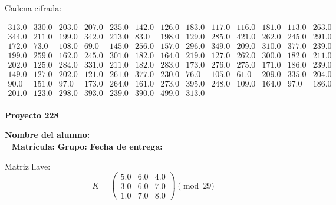 \documentclass[12pt]{article}
\begin{document}
Cadena cifrada:
\begin{center}
$\begin{array}{lllllllllllll}
313.0 & 330.0 & 203.0 & 207.0 & 235.0 & 142.0 & 126.0 & 183.0 & 117.0 & 116.0 & 181.0 & 113.0 & 263.0\\
344.0 & 211.0 & 199.0 & 342.0 & 213.0 & 83.0 & 198.0 & 129.0 & 285.0 & 421.0 & 262.0 & 245.0 & 291.0\\
172.0 & 73.0 & 108.0 & 69.0 & 145.0 & 256.0 & 157.0 & 296.0 & 349.0 & 209.0 & 310.0 & 377.0 & 239.0\\
199.0 & 259.0 & 162.0 & 245.0 & 301.0 & 182.0 & 164.0 & 219.0 & 127.0 & 262.0 & 300.0 & 182.0 & 211.0\\
202.0 & 125.0 & 284.0 & 331.0 & 211.0 & 182.0 & 283.0 & 173.0 & 276.0 & 275.0 & 171.0 & 186.0 & 239.0\\
149.0 & 127.0 & 202.0 & 121.0 & 261.0 & 377.0 & 230.0 & 76.0 & 105.0 & 61.0 & 209.0 & 335.0 & 204.0\\
90.0 & 151.0 & 97.0 & 173.0 & 264.0 & 161.0 & 273.0 & 395.0 & 248.0 & 109.0 & 164.0 & 97.0 & 186.0\\
201.0 & 123.0 & 298.0 & 393.0 & 239.0 & 390.0 & 499.0 & 313.0\\
\end{array}$
\end{center}

\newpage


\textbf{Proyecto 228}

\textbf{Nombre del alumno:} \underline{\hspace{13cm}}\\\
\vspace{1cm}
\textbf{Matrícula:} \underline{\hspace{4cm}} \hspace{1cm}
\textbf{Grupo:} \underline{\hspace{2cm}}
\textbf{Fecha de entrega:} \underline{\hspace{2cm}}

\medskip

Matriz llave:
\[
K = \begin{pmatrix}
5.0 & 6.0 & 4.0\\
3.0 & 6.0 & 7.0\\
1.0 & 7.0 & 8.0
\end{pmatrix} \pmod{29}
\]
\end{document}
